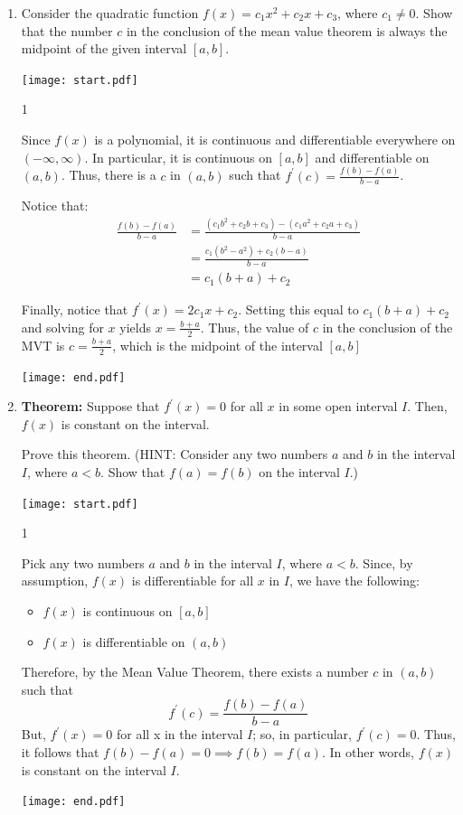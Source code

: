 \documentclass[12pt]{article}
\begin{document}
\begin{enumerate}
\begin{enumerate}
\end{enumerate}

\item Consider the quadratic function $f(x)=c_1x^2+c_2x+c_3$, where $c_1 \neq 0$.  Show that the number $c$ in the conclusion of the mean value theorem is always the midpoint of the given interval $[a,b]$.

\texttt{[image: start.pdf]}
{{{1\linewidth}{Since $f(x)$ is a polynomial, it is continuous and differentiable everywhere on $(-\infty,\infty)$.  In particular, it is continuous on $[a,b]$ and differentiable on $(a,b)$.  Thus, there is a $c$ in $(a,b)$ such that $f^{\prime}(c)=\frac{f(b)-f(a)}{b-a}$.

Notice that:
\begin{align*}
\frac{f(b)-f(a)}{b-a}&=\frac{(c_1b^2+c_2b+c_3)-(c_1a^2+c_2a+c_3)}{b-a}\\
&=\frac{c_1(b^2-a^2)+c_2(b-a)}{b-a}\\
&=c_1(b+a)+c_2
\end{align*}

Finally, notice that $f^{\prime}(x)=2c_1x+c_2$.  Setting this equal to $c_1(b+a)+c_2$ and solving for $x$ yields $x=\frac{b+a}{2}$.  Thus, the value of $c$ in the conclusion of the MVT is $c=\frac{b+a}{2}$, which is the midpoint of the interval $[a,b]$}}}
\texttt{[image: end.pdf]}


\item {\bf Theorem:} Suppose that $f^{\prime}(x)=0$ for all $x$ in some open interval $I$.  Then, $f(x)$ is constant on the interval.

Prove this theorem. (HINT: Consider any two numbers $a$ and $b$ in the interval $I$, where $a<b$.  Show that $f(a)=f(b)$ on the interval $I$.)

\texttt{[image: start.pdf]}
{{{1\linewidth}{Pick any two numbers $a$ and $b$ in the interval $I$, where $a<b$.  Since, by assumption,  $f(x)$ is differentiable for all $x$ in $I$, we have the following:
\begin{itemize}
\item $f(x)$ is continuous on $[a,b]$
\item $f(x)$ is differentiable on $(a,b)$
\end{itemize}
Therefore, by the Mean Value Theorem, there exists a number $c$ in $(a,b)$ such that $$f^{\prime}(c)=\frac{f(b)-f(a)}{b-a}$$  But, $f^{\prime}(x)=0$ for all x in the interval $I$; so, in particular, $f^{\prime}(c)=0$.  Thus, it follows that $f(b)-f(a)=0 \implies f(b)=f(a)$.  In other words, $f(x)$ is constant on the interval $I$.}}}
\texttt{[image: end.pdf]}



\end{enumerate}
\end{document}
